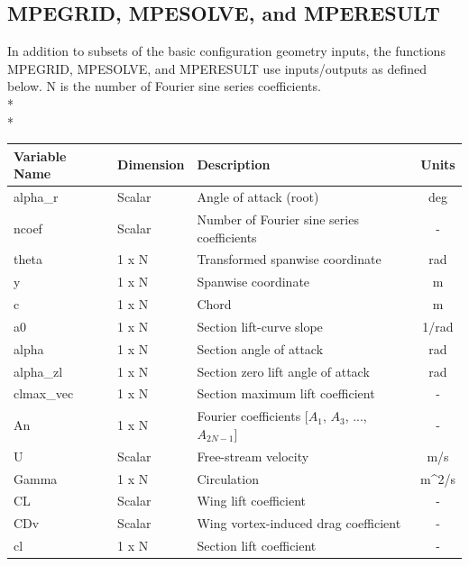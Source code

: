 \documentclass{article}
\begin{document}
\subsection{MPEGRID, MPESOLVE, and MPERESULT}
In addition to subsets of the basic configuration geometry inputs, the
functions MPEGRID, MPESOLVE, and MPERESULT use inputs/outputs as
defined below.  N is the number of Fourier sine series
coefficients.\\*\\*
\begin{tabular}{|l|l|p{2.5in}|c|}
  \hline
  \textbf{Variable Name} &
  \textbf{Dimension} &
  \textbf{Description} &
  \textbf{Units}
  \\
  \hline
  alpha\_r & Scalar &
  Angle of attack (root) &
  deg
  \\
  \hline
  ncoef & Scalar &
  Number of Fourier sine series coefficients &
  -
  \\
  \hline
  theta & 1 x N &
  Transformed spanwise coordinate &
  rad
  \\
  \hline
  y & 1 x N &
  Spanwise coordinate &
  m
  \\
  \hline
  c & 1 x N &
  Chord &
  m
  \\
  \hline
  a0 & 1 x N &
  Section lift-curve slope &
  1/rad
  \\
  \hline
  alpha & 1 x N &
  Section angle of attack &
  rad
  \\
  \hline
  alpha\_zl & 1 x N &
  Section zero lift angle of attack &
  rad
  \\
  \hline
  clmax\_vec & 1 x N &
  Section maximum lift coefficient &
  -
  \\
  \hline
  An & 1 x N &
  Fourier coefficients [$A_1$, $A_3$, ..., $A_{2N-1}$] &
  -
  \\
  \hline
  U & Scalar &
  Free-stream velocity &
  m/s
  \\
  \hline
  Gamma & 1 x N &
  Circulation &
  m\^{}2/s
  \\
  \hline
  CL & Scalar &
  Wing lift coefficient &
  -
  \\
  \hline
  CDv & Scalar &
  Wing vortex-induced drag coefficient &
  -
  \\
  \hline
  cl & 1 x N &
  Section lift coefficient &
  -
  \\
  \hline
\end{tabular}
\end{document}
